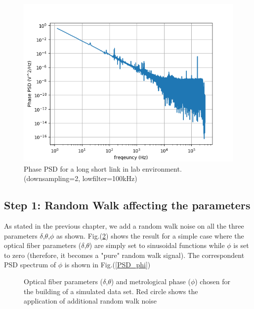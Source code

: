 \documentclass[ fontsize=11pt]{scrartcl} %
\numberwithin{equation}{section} %
\numberwithin{figure}{section} %
\numberwithin{table}{section} %
\begin{document}
\begin{figure}[hbtp]
\centering
\includegraphics[scale=0.75]{immagini_noise/noise_short.png}
\caption{Phase PSD for a long short link in lab environment. (downsampling=2, lowfilter=100kHz)}
\label{psd_short}
\end{figure}

\pagebreak

\subsection{Step 1: Random Walk affecting the parameters}

As stated in the previous chapter, we add a random walk noise on all the three parameters $\delta$,$\theta$,$\phi$ as shown. Fig.(\ref{randwalk_par}) shows the result for a simple case where the optical fiber parameters ($\delta$,$\theta$) are simply set to sinusoidal functions while $\phi$ is set to zero (therefore, it becomes a "pure" random walk signal). The correspondent PSD spectrum of $\phi$ is shown in Fig.(\ref{PSD_phi})

\begin{center}
\begin{figure}[hbtp]
\caption{Optical fiber parameters ($\delta$,$\theta$) and metrological phase ($\phi$) chosen for the building of a simulated data set. Red circle shows the application of additional random walk noise}
\label{randwalk_par}
\end{figure}
\end{center}
\end{document}
